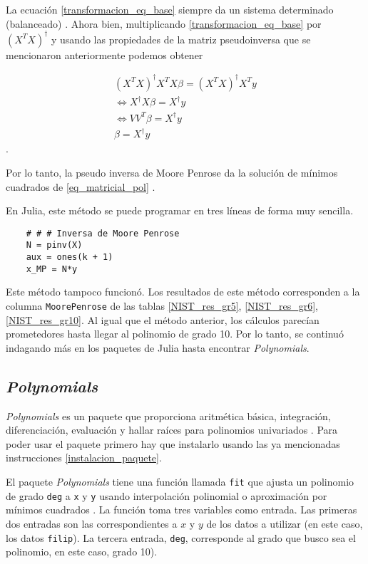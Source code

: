 La ecuación \ref{transformacion_eq_base} siempre da un sistema determinado (balanceado) \cite{worldScientificNews}. Ahora bien, multiplicando \ref{transformacion_eq_base} por $(X^{T}X)^{\dagger}$ y usando las propiedades de la matriz pseudoinversa que se mencionaron anteriormente podemos obtener 


\begin{equation*}
    \begin{aligned}
    (X^{T}X)^{\dagger} X^{T}X \beta = (X^{T}X)^{\dagger} X^{T} y \\
    \iff X^{\dagger} X \beta = X^{\dagger} y \\
    \iff V V^{T} \beta = X^{\dagger} y \\
    \beta = X^{\dagger} y 
    \end{aligned}
\end{equation*}. 

Por lo tanto, la pseudo inversa de Moore Penrose da la solución de mínimos cuadrados de \ref{eq_matricial_pol} \citep{worldScientificNews}.


En Julia, este método se puede programar en tres líneas de forma muy sencilla. 

\begin{verbatim}
    # # # Inversa de Moore Penrose
    N = pinv(X)
    aux = ones(k + 1)
    x_MP = N*y 
\end{verbatim}

Este método tampoco funcionó. Los resultados de este método corresponden a la columna \texttt{MoorePenrose} de las tablas \ref{NIST_res_gr5}, \ref{NIST_res_gr6}, \ref{NIST_res_gr10}. Al igual que el método anterior, los cálculos parecían prometedores hasta llegar al polinomio de grado 10.  Por lo tanto, se continuó indagando más en los paquetes de Julia hasta encontrar \textit{Polynomials}. 

\subsection{\textit{Polynomials}}
\textit{Polynomials} es un paquete que proporciona aritmética básica, integración, diferenciación, evaluación y hallar raíces para polinomios univariados \cite{poly_manual}. Para poder usar el paquete primero hay que instalarlo usando las ya mencionadas instrucciones \ref{instalacion_paquete}. 


El paquete \textit{Polynomials} tiene una función llamada \texttt{fit} que ajusta un polinomio de grado \texttt{deg} a \texttt{x} y \texttt{y} usando interpolación polinomial o aproximación por mínimos cuadrados \cite{poly_manual}. La función toma tres variables como entrada. Las primeras dos entradas son las correspondientes a $x$ y $y$ de los datos a utilizar (en este caso, los datos \texttt{filip}). La tercera entrada, \texttt{deg},  corresponde al grado que busco sea el polinomio, en este caso, grado 10). 

